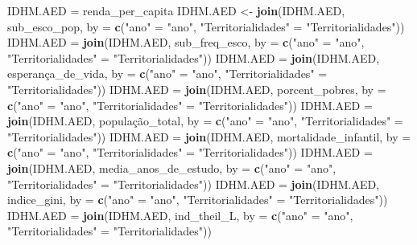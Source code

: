 \documentclass[
]{article}
\newenvironment{Shaded}{\begin{snugshade}}{\end{snugshade}}
\newcommand{\AttributeTok}[1]{\textcolor[rgb]{0.13,0.29,0.53}{#1}}
\newcommand{\FunctionTok}[1]{\textcolor[rgb]{0.13,0.29,0.53}{\textbf{#1}}}
\newcommand{\NormalTok}[1]{#1}
\newcommand{\OtherTok}[1]{\textcolor[rgb]{0.56,0.35,0.01}{#1}}
\newcommand{\StringTok}[1]{\textcolor[rgb]{0.31,0.60,0.02}{#1}}
\begin{document}
\begin{Shaded}
\begin{Highlighting}[]
\NormalTok{IDHM.AED }\OtherTok{=}\NormalTok{ renda\_per\_capita}
\NormalTok{IDHM.AED }\OtherTok{\textless{}{-}} \FunctionTok{join}\NormalTok{(IDHM.AED, sub\_esco\_pop, }\AttributeTok{by =} \FunctionTok{c}\NormalTok{(}\StringTok{"ano"} \OtherTok{=} \StringTok{"ano"}\NormalTok{, }\StringTok{"Territorialidades"} \OtherTok{=} \StringTok{"Territorialidades"}\NormalTok{))}
\NormalTok{IDHM.AED }\OtherTok{=} \FunctionTok{join}\NormalTok{(IDHM.AED, sub\_freq\_esco, }\AttributeTok{by =} \FunctionTok{c}\NormalTok{(}\StringTok{"ano"} \OtherTok{=} \StringTok{"ano"}\NormalTok{, }\StringTok{"Territorialidades"} \OtherTok{=} \StringTok{"Territorialidades"}\NormalTok{))}
\NormalTok{IDHM.AED }\OtherTok{=} \FunctionTok{join}\NormalTok{(IDHM.AED, esperança\_de\_vida, }\AttributeTok{by =} \FunctionTok{c}\NormalTok{(}\StringTok{"ano"} \OtherTok{=} \StringTok{"ano"}\NormalTok{, }\StringTok{"Territorialidades"} \OtherTok{=} \StringTok{"Territorialidades"}\NormalTok{))}
\NormalTok{IDHM.AED }\OtherTok{=} \FunctionTok{join}\NormalTok{(IDHM.AED, porcent\_pobres, }\AttributeTok{by =} \FunctionTok{c}\NormalTok{(}\StringTok{"ano"} \OtherTok{=} \StringTok{"ano"}\NormalTok{, }\StringTok{"Territorialidades"} \OtherTok{=} \StringTok{"Territorialidades"}\NormalTok{))}
\NormalTok{IDHM.AED }\OtherTok{=} \FunctionTok{join}\NormalTok{(IDHM.AED, população\_total, }\AttributeTok{by =} \FunctionTok{c}\NormalTok{(}\StringTok{"ano"} \OtherTok{=} \StringTok{"ano"}\NormalTok{, }\StringTok{"Territorialidades"} \OtherTok{=} \StringTok{"Territorialidades"}\NormalTok{))}
\NormalTok{IDHM.AED }\OtherTok{=} \FunctionTok{join}\NormalTok{(IDHM.AED, mortalidade\_infantil, }\AttributeTok{by =} \FunctionTok{c}\NormalTok{(}\StringTok{"ano"} \OtherTok{=} \StringTok{"ano"}\NormalTok{, }\StringTok{"Territorialidades"} \OtherTok{=} \StringTok{"Territorialidades"}\NormalTok{))}
\NormalTok{IDHM.AED }\OtherTok{=} \FunctionTok{join}\NormalTok{(IDHM.AED, media\_anos\_de\_estudo, }\AttributeTok{by =} \FunctionTok{c}\NormalTok{(}\StringTok{"ano"} \OtherTok{=} \StringTok{"ano"}\NormalTok{, }\StringTok{"Territorialidades"} \OtherTok{=} \StringTok{"Territorialidades"}\NormalTok{))}
\NormalTok{IDHM.AED }\OtherTok{=} \FunctionTok{join}\NormalTok{(IDHM.AED, indice\_gini, }\AttributeTok{by =} \FunctionTok{c}\NormalTok{(}\StringTok{"ano"} \OtherTok{=} \StringTok{"ano"}\NormalTok{, }\StringTok{"Territorialidades"} \OtherTok{=} \StringTok{"Territorialidades"}\NormalTok{))}
\NormalTok{IDHM.AED }\OtherTok{=} \FunctionTok{join}\NormalTok{(IDHM.AED, ind\_theil\_L, }\AttributeTok{by =} \FunctionTok{c}\NormalTok{(}\StringTok{"ano"} \OtherTok{=} \StringTok{"ano"}\NormalTok{, }\StringTok{"Territorialidades"} \OtherTok{=} \StringTok{"Territorialidades"}\NormalTok{))}

\end{Highlighting}
\end{Shaded}
\end{document}
